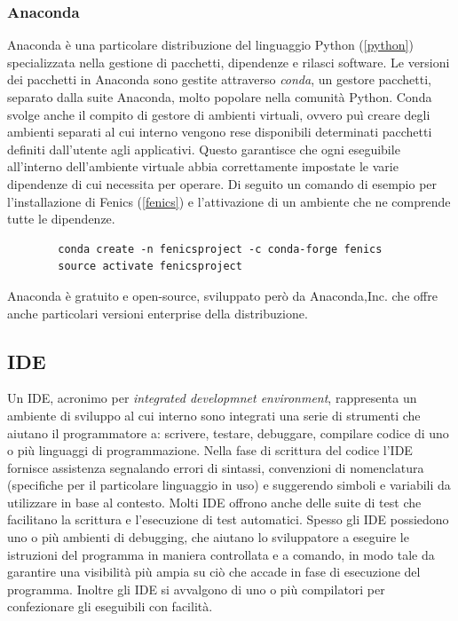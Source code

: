         \subsubsection{Anaconda}\label{anaconda}
        Anaconda è una particolare distribuzione del linguaggio Python (\ref{python}) specializzata nella gestione di pacchetti,
        dipendenze e rilasci software. Le versioni dei pacchetti in Anaconda sono gestite attraverso \textit{conda}, un
        gestore pacchetti, separato dalla suite Anaconda, molto popolare nella comunità Python. Conda svolge anche il compito di
        gestore di ambienti virtuali, ovvero puì creare degli ambienti separati al cui interno vengono rese disponibili
        determinati pacchetti definiti dall'utente agli applicativi. Questo garantisce che ogni eseguibile all'interno dell'ambiente
        virtuale abbia correttamente impostate le varie dipendenze di cui necessita per operare. Di seguito un comando di esempio
        per l'installazione di Fenics (\ref{fenics}) e l'attivazione di un ambiente che ne comprende tutte le dipendenze.

        \begin{verbatim}
        conda create -n fenicsproject -c conda-forge fenics
        source activate fenicsproject
        \end{verbatim}
        Anaconda è gratuito e open-source, sviluppato però da Anaconda,Inc. che offre anche particolari
        versioni enterprise della distribuzione.

    \subsection{IDE}
    Un IDE, acronimo per \textit{integrated developmnet environment}, rappresenta un ambiente di sviluppo al
    cui interno sono integrati una serie di strumenti che aiutano il programmatore a: scrivere, testare,
    debuggare, compilare codice di uno o più linguaggi di programmazione.
    Nella fase di scrittura del codice l'IDE fornisce assistenza segnalando errori di sintassi, convenzioni
    di nomenclatura (specifiche per il particolare linguaggio in uso) e suggerendo simboli e variabili da utilizzare
    in base al contesto. Molti IDE offrono anche delle suite di test che facilitano la scrittura e l'esecuzione di
    test automatici. Spesso gli IDE possiedono uno o più ambienti di debugging, che aiutano lo sviluppatore a
    eseguire le istruzioni del programma in maniera controllata e a comando, in modo tale da garantire una visibilità
    più ampia su ciò che accade in fase di esecuzione del programma. Inoltre gli IDE si avvalgono di uno o più compilatori
    per confezionare gli eseguibili con facilità.


